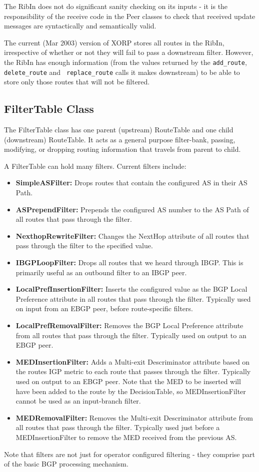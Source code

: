 \documentclass[11pt]{article}
\begin{document}
The RibIn does not do significant sanity checking on its inputs - it
is the responsibility of the receive code in the Peer classes to check
that received update messages are syntactically and semantically
valid.

The current (Mar 2003) version of XORP stores all routes in the RibIn,
irrespective of whether or not they will fail to pass a downstream
filter.  However, the RibIn has enough information (from the values
returned by the {\tt add\_route}, {\tt delete\_route} and {\tt
replace\_route} calls it makes downstream) to be able to store only
those routes that will not be filtered.

\subsection{FilterTable Class}

The FilterTable class has one parent (upstream) RouteTable and one
child (downstream) RouteTable.  It acts as a general purpose
filter-bank, passing, modifying, or dropping routing information that
travels from parent to child.

A FilterTable can hold many filters.  Current filters include:
\begin{itemize}
\item {\bf SimpleASFilter:}  Drops routes that contain the configured
AS in their AS Path.
\item {\bf ASPrependFilter:} Prepends the configured AS number to the
AS Path of all
routes that pass through the filter.
\item {\bf NexthopRewriteFilter:} Changes the NextHop attribute of all
routes that pass through the filter to the specified value.
\item {\bf IBGPLoopFilter:} Drops all routes that we heard through
IBGP.  This is primarily useful as an outbound filter to an IBGP peer.
\item {\bf LocalPrefInsertionFilter:} Inserts the configured value as
the BGP Local Preference attribute in all routes that pass through the
filter.  Typically used on input from an EBGP peer, before
route-specific filters.
\item {\bf LocalPrefRemovalFilter:} Removes the BGP Local Preference
attribute from all routes that pass through the filter.  Typically
used on output to an EBGP peer.
\item {\bf MEDInsertionFilter:} Adds a Multi-exit Descriminator
attribute based on the routes IGP metric to each route that passes
through the filter.  Typically used on output to an EBGP peer.  Note
that the MED to be inserted will have been added to the route by the
DecisionTable, so MEDInsertionFilter cannot be used as an input-branch
filter.
\item {\bf MEDRemovalFilter:} Removes the  Multi-exit Descriminator
attribute from all routes that pass through the filter.  Typically
used just before a MEDInsertionFilter to remove the MED received from
the previous AS.
\end{itemize}
Note that filters are not just for operator configured filtering -
they comprise part of the basic BGP processing mechanism.
\end{document}
